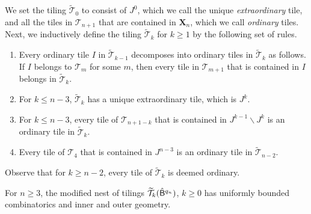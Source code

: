 \documentclass{amsart}
\begin{document}
We set the tiling $\widetilde{\mathcal{T}}_{0}$ to consist of $J^0$, which we call the unique \emph{extraordinary} tile, and all the tiles in $\mathcal{T}_{n+1}$ that are contained in $\mathbf{X}_n$, which we call \emph{ordinary} tiles.
Next, we inductively define the tiling $\widetilde{\mathcal{T}}_{k}$ for $k \geq 1$ by the following set of rules. 
\begin{enumerate}[label=\textnormal{(\roman*)}]
    \item Every ordinary tile $I$ in $\widetilde{\mathcal{T}}_{k-1}$ decomposes into ordinary tiles in $\widetilde{\mathcal{T}}_k$ as follows.
    If $I$ belongs to $\mathcal{T}_m$ for some $m$, then every tile in $\mathcal{T}_{m+1}$ that is contained in $I$ belongs in $\widetilde{\mathcal{T}}_{k}$.
    \item For $k \leq n-3$, $\widetilde{\mathcal{T}}_k$ has a unique extraordinary tile, which is $J^k$.
    \item For $k \leq n-3$, every tile of $\mathcal{T}_{n+1-k}$ that is contained in $J^{k-1} \backslash J^k$ is an ordinary tile in $\widetilde{\mathcal{T}}_k$.
    \item Every tile of $\mathcal{T}_{4}$ that is contained in $J^{n-3}$ is an ordinary tile in $\widetilde{\mathcal{T}}_{n-2}$. 
\end{enumerate} 
Observe that for $k \geq n-2$, every tile of $\widetilde{\mathcal{T}}_k$ is deemed ordinary.

\begin{lemma}
\label{lem:uniform-tiling}
    For $n \geq 3$, the modified nest of tilings $\widetilde{\mathcal{T}}_k(\hat{\mathsf{B}}^{q_n})$, $k\geq 0$ has uniformly bounded combinatorics and inner and outer geometry.
\end{lemma}
\end{document}
